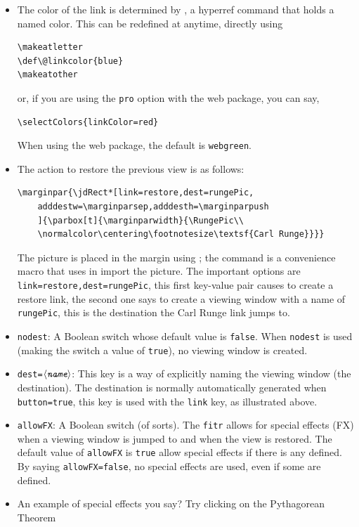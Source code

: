\documentclass{article}
\def\meta#1{$\langle\textit{\texttt{#1}}\rangle$}
\begin{document}
\begin{itemize}
\item[] The color of the link is determined by , a \textsf{hyperref}
command that holds a named color. This can be redefined at anytime,
directly using
\begin{Verbatim}[xleftmargin=20pt]
\makeatletter
\def\@linkcolor{blue}
\makeatother
\end{Verbatim}
or, if you are using the \texttt{pro} option with the \textsf{web}
package, you can say,
\begin{Verbatim}[xleftmargin=20pt]
\selectColors{linkColor=red}
\end{Verbatim}
When using the \textsf{web} package, the default is \texttt{webgreen}.

\item[] The action to restore the previous view is as follows:
\begin{Verbatim}[xleftmargin=20pt]
\marginpar{\jdRect*[link=restore,dest=rungePic,
    adddestw=\marginparsep,adddesth=\marginparpush
    ]{\parbox[t]{\marginparwidth}{\RungePic\\
    \normalcolor\centering\footnotesize\textsf{Carl Runge}}}}
\end{Verbatim}
The picture is placed in the margin using ; the command
 is a convenience macro that uses  in
import the picture. The important options are
\texttt{link=restore,dest=rungePic}, this first key-value pair causes
 to create a restore link, the second one says to create a
viewing window with a name of \texttt{rungePic}, this is the
destination the Carl Runge link jumps to.


\item \texttt{nodest}: A Boolean switch whose default value is
    \texttt{false}. When \texttt{nodest} is used (making the switch a
    value of \texttt{true}), no viewing window is created.

\item \texttt{dest=\meta{name}}: This key is a way of explicitly naming the
    viewing window (the destination). The destination is normally
    automatically generated when \texttt{button=true}, this key is
    used with the \texttt{link} key, as illustrated above.
\item \texttt{allowFX}: A Boolean switch (of sorts). The \texttt{fitr}
    allows for special effects (FX) when a viewing window is jumped to
    and when the view is restored. The default value of
    \texttt{allowFX} is \texttt{true} allow special effects if there
    is any defined. By saying \texttt{allowFX=false}, no special
    effects are used, even if some are defined.

\item[] An example of special effects you say? Try clicking on the
    Pythagorean Theorem
\end{itemize}
\end{document}
